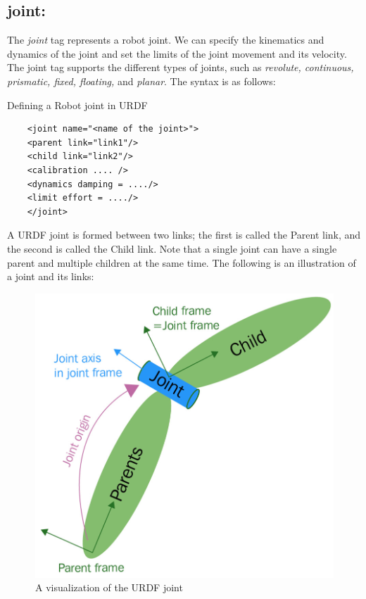 \documentclass[../../main]{subfiles}
\begin{document}
\subsection{joint:}
The \emph{joint} tag represents a robot joint. We can specify the kinematics and
dynamics of the joint and set the limits of the joint movement and its velocity. The
joint tag supports the different types of joints, such as \emph{revolute, continuous,
prismatic, fixed, floating,} and \emph{planar}.
The syntax is as follows:
\begin{codebox}[]{Defining a Robot joint in URDF}
  \begin{verbatim}
    <joint name="<name of the joint>">
    <parent link="link1"/>
    <child link="link2"/>
    <calibration .... />
    <dynamics damping = ..../>
    <limit effort = ..../>
    </joint>
\end{verbatim}
\end{codebox}
A URDF joint is formed between two links; the first is called the Parent link, and the
second is called the Child link. Note that a single joint can have a single parent and
multiple children at the same time. The following is an illustration of a joint and its links:
\begin{figure}[ht]
    \centering
    \includegraphics{sublatex/hashem/img/joint1.jpg}
    \caption{A visualization of the URDF joint\cite{joseph2018mastering}}
\end{figure}
\end{document}
